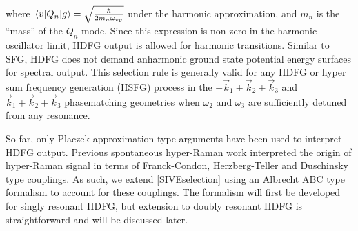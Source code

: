 \documentclass[aip, jcp, reprint, onecolumn]{revtex4-2}
\begin{document}
where $\mel{v}{Q_n}{g} = \sqrt{\frac{\hbar}{2m_n\omega_{vg}}}$ under the harmonic approximation,\cite{RN230} and $m_n$ is the ``mass'' of the $Q_n$ mode. 
Since this expression is non-zero in the harmonic oscillator limit, HDFG output is allowed for harmonic transitions. 
Similar to SFG, HDFG does not demand anharmonic ground state potential energy surfaces for spectral output. \cite{Shen94, Cho2000}
This selection rule is generally valid for any HDFG or hyper sum frequency generation (HSFG) process in the $-\vec{k}_1 + \vec{k}_2  + \vec{k}_3$ and $\vec{k}_1 + \vec{k}_2  + \vec{k}_3$ phasematching geometries when $\omega_2$ and $\omega_3$ are sufficiently detuned from any resonance.

So far, only Placzek approximation type arguments have been used to interpret HDFG output.
Previous spontaneous hyper-Raman work interpreted the origin of hyper-Raman signal in terms of Franck-Condon, Herzberg-Teller and Duschinsky type couplings.\cite{Ziegler1988} 
As such, we extend \autoref{SIVEselection} using an Albrecht ABC type formalism to account for these couplings.
The formalism will first be developed for singly resonant HDFG, but extension to doubly resonant HDFG is straightforward and will be discussed later. 
\end{document}
